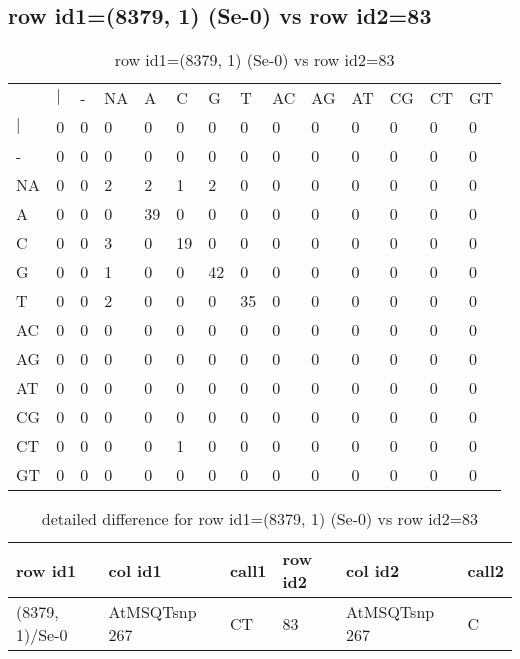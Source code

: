 \subsection{row id1=(8379, 1) (Se-0) vs row id2=83}
\begin{center}
\begin{longtable}{|l|l|l|l|l|l|l|l|l|l|l|l|l|l|}
\caption{row id1=(8379, 1) (Se-0) vs row id2=83} \label{table_dm614}\\
\hline
\\
\hline
&$|$&-&NA&A&C&G&T&AC&AG&AT&CG&CT&GT\\
$|$&0&0&0&0&0&0&0&0&0&0&0&0&0\\
-&0&0&0&0&0&0&0&0&0&0&0&0&0\\
NA&0&0&2&2&1&2&0&0&0&0&0&0&0\\
A&0&0&0&39&0&0&0&0&0&0&0&0&0\\
C&0&0&3&0&19&0&0&0&0&0&0&0&0\\
G&0&0&1&0&0&42&0&0&0&0&0&0&0\\
T&0&0&2&0&0&0&35&0&0&0&0&0&0\\
AC&0&0&0&0&0&0&0&0&0&0&0&0&0\\
AG&0&0&0&0&0&0&0&0&0&0&0&0&0\\
AT&0&0&0&0&0&0&0&0&0&0&0&0&0\\
CG&0&0&0&0&0&0&0&0&0&0&0&0&0\\
CT&0&0&0&0&1&0&0&0&0&0&0&0&0\\
GT&0&0&0&0&0&0&0&0&0&0&0&0&0\\
\hline
\end{longtable}
\end{center}

\begin{center}
\begin{longtable}{|l|l|l|l|l|l|}
\caption{detailed difference for row id1=(8379, 1) (Se-0) vs row id2=83} \label{table_dm615}\\
\hline
row id1&col id1&call1&row id2&col id2&call2\\
\hline
(8379, 1)/Se-0&AtMSQTsnp 267&CT&83&AtMSQTsnp 267&C\\
\hline
\end{longtable}
\end{center}

